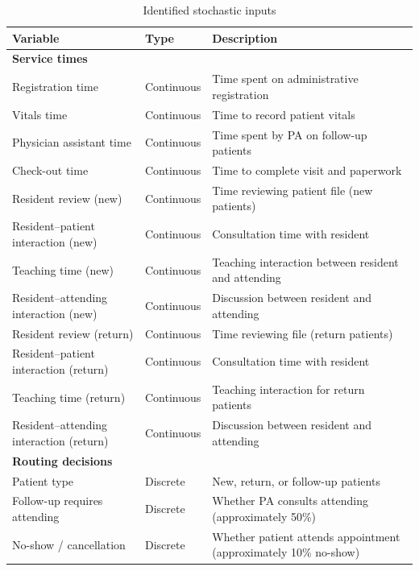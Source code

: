 \begin{table}[H]
\centering
\small
\begin{tabularx}{\textwidth}{p{4cm} p{2cm} X}
\toprule
\textbf{Variable} & \textbf{Type} & \textbf{Description} \\
\midrule

\multicolumn{3}{l}{\textbf{Service times}} \\
Registration time & Continuous & Time spent on administrative registration \\
Vitals time & Continuous & Time to record patient vitals \\
Physician assistant time & Continuous & Time spent by PA on follow-up patients \\
Check-out time & Continuous & Time to complete visit and paperwork \\
Resident review (new) & Continuous & Time reviewing patient file (new patients) \\
Resident--patient interaction (new) & Continuous & Consultation time with resident \\
Teaching time (new) & Continuous & Teaching interaction between resident and attending \\
Resident--attending interaction (new) & Continuous & Discussion between resident and attending \\
Resident review (return) & Continuous & Time reviewing file (return patients) \\
Resident--patient interaction (return) & Continuous & Consultation time with resident \\
Teaching time (return) & Continuous & Teaching interaction for return patients \\
Resident--attending interaction (return) & Continuous & Discussion between resident and attending \\

\midrule
\multicolumn{3}{l}{\textbf{Routing decisions}} \\
Patient type & Discrete & New, return, or follow-up patients \\
Follow-up requires attending & Discrete & Whether PA consults attending (approximately 50\%) \\
No-show / cancellation & Discrete & Whether patient attends appointment (approximately 10\% no-show) \\

\bottomrule
\end{tabularx}
\caption{Identified stochastic inputs}
\label{tab:stochastic_vars}
\end{table}